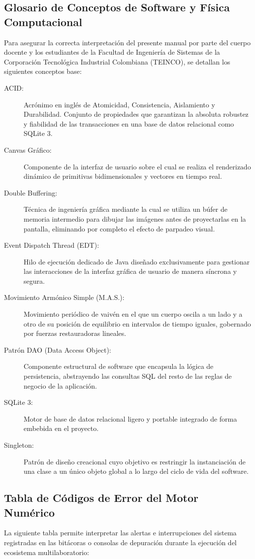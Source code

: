 \documentclass[11pt,a4paper]{article}
\begin{document}
	\subsection{Glosario de Conceptos de Software y Física Computacional}
	Para asegurar la correcta interpretación del presente manual por parte del cuerpo docente y los estudiantes de la Facultad de Ingeniería de Sistemas de la Corporación Tecnológica Industrial Colombiana (TEINCO), se detallan los siguientes conceptos base:
	\begin{description}
		\item[ACID:] Acrónimo en inglés de Atomicidad, Consistencia, Aislamiento y Durabilidad. Conjunto de propiedades que garantizan la absoluta robustez y fiabilidad de las transacciones en una base de datos relacional como SQLite 3.
		\item[Canvas Gráfico:] Componente de la interfaz de usuario sobre el cual se realiza el renderizado dinámico de primitivas bidimensionales y vectores en tiempo real.
		\item[Double Buffering:] Técnica de ingeniería gráfica mediante la cual se utiliza un búfer de memoria intermedio para dibujar las imágenes antes de proyectarlas en la pantalla, eliminando por completo el efecto de parpadeo visual.
		\item[Event Dispatch Thread (EDT):] Hilo de ejecución dedicado de Java diseñado exclusivamente para gestionar las interacciones de la interfaz gráfica de usuario de manera síncrona y segura.
		\item[Movimiento Armónico Simple (M.A.S.):] Movimiento periódico de vaivén en el que un cuerpo oscila a un lado y a otro de su posición de equilibrio en intervalos de tiempo iguales, gobernado por fuerzas restauradoras lineales.
		\item[Patrón DAO (Data Access Object):] Componente estructural de software que encapsula la lógica de persistencia, abstrayendo las consultas SQL del resto de las reglas de negocio de la aplicación.
		\item[SQLite 3:] Motor de base de datos relacional ligero y portable integrado de forma embebida en el proyecto. %
		\item[Singleton:] Patrón de diseño creacional cuyo objetivo es restringir la instanciación de una clase a un único objeto global a lo largo del ciclo de vida del software.
	\end{description}
	
	\subsection{Tabla de Códigos de Error del Motor Numérico}
	La siguiente tabla permite interpretar las alertas e interrupciones del sistema registradas en las bitácoras o consolas de depuración durante la ejecución del ecosistema multilaboratorio:
	
\end{document}

